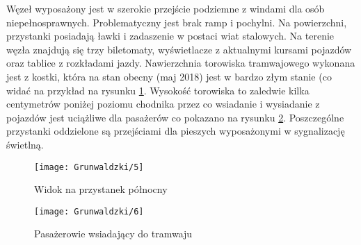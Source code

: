 \documentclass[twoside,12pt]{article}
\begin{document}
	Węzeł wyposażony jest w szerokie przejście podziemne z windami dla osób niepełnosprawnych. Problematyczny jest brak ramp i pochylni. Na powierzchni, przystanki posiadają ławki i zadaszenie w postaci wiat stalowych. Na terenie węzła znajdują się trzy biletomaty, wyświetlacze z aktualnymi kursami pojazdów oraz tablice z rozkładami jazdy. Nawierzchnia torowiska tramwajowego wykonana jest z kostki, która na stan obecny (maj 2018) jest w bardzo złym stanie (co widać na przykład na rysunku \ref{grunwaldzki5}. Wysokość torowiska to zaledwie kilka centymetrów poniżej poziomu chodnika przez co wsiadanie i wysiadanie z pojazdów jest uciążliwe dla pasażerów co pokazano na rysunku \ref{grunwaldzki6}. Poszczególne przystanki oddzielone są przejściami dla pieszych wyposażonymi w sygnalizację świetlną. 
	
	\begin{figure}[H]
		\centering
		\texttt{[image: Grunwaldzki/5]}\\
		\caption{Widok na przystanek północny}
		\label{grunwaldzki5}
	\end{figure}	
	
		\begin{figure}[H]
		\centering
		\texttt{[image: Grunwaldzki/6]}\\
		\caption{Pasażerowie wsiadający do tramwaju}
		\label{grunwaldzki6}
	\end{figure}	
	
\end{document}

